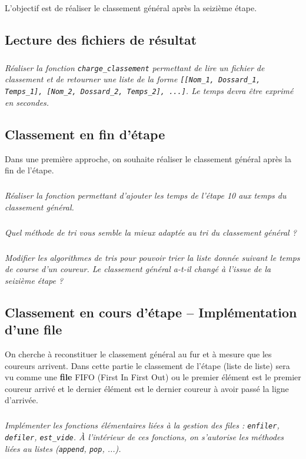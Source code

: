 \documentclass[10pt,fleqn]{article} %
\begin{document}
\begin{multicols}{2}
\begin{obj}
L'objectif est de réaliser le classement général après la seizième étape. 
\end{obj}

\subsection*{Lecture des fichiers de résultat}
\setcounter{exo}{0}
\subparagraph{}
\textit{Réaliser la fonction \texttt{charge\_classement} permettant de lire un fichier de classement 
et de retourner une liste de la forme \texttt{[[Nom\_1, Dossard\_1, Temps\_1], [Nom\_2, Dossard\_2, Temps\_2], ...]}. Le temps devra être exprimé en secondes.}



\subsection*{Classement en fin d'étape}
Dans une première approche, on souhaite réaliser le classement général après la fin de l'étape. 

\subparagraph{}
\textit{Réaliser la fonction permettant d'ajouter les temps de l'étape 10 aux temps du classement général.}

\subparagraph{}
\textit{Quel méthode de tri vous semble la mieux adaptée au tri du classement général ?}


\subparagraph{}
\textit{Modifier les algorithmes de tris pour pouvoir trier la liste donnée suivant le temps de course d'un coureur. Le classement général a-t-il changé à l'issue de la seizième étape ?}


\subsection*{Classement en cours d'étape -- Implémentation d'une file}
On cherche à reconstituer le classement général au fur et à mesure que les coureurs arrivent. Dans cette partie le classement de l'étape (liste de liste) sera vu comme une \textbf{file} FIFO (First In First Out) ou le premier élément est le premier coureur arrivé et le dernier élément est le dernier coureur à avoir passé la ligne d'arrivée.  

\subparagraph{}\textit{Implémenter les fonctions élémentaires liées à la gestion des files : \texttt{enfiler}, \texttt{defiler}, \texttt{est\_vide}. À l'intérieur de ces fonctions, on s'autorise les méthodes liées au listes (\texttt{append}, \texttt{pop}, ...).}



\end{multicols}
\end{document}
